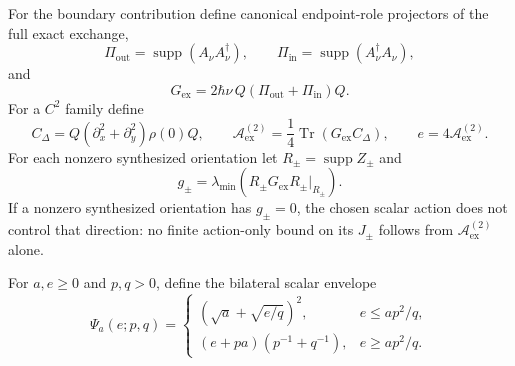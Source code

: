 \documentclass[aps,pra,preprint,nofootinbib]{revtex4-2}
\newcommand{\Tr}{\operatorname{Tr}}
\newcommand{\supp}{\operatorname{supp}}
\newcommand{\Aact}{\mathcal A}
\begin{document}
For the boundary contribution define canonical endpoint-role projectors of the full exact exchange,
\begin{equation}
\Pi_{\mathrm{out}}=\supp(A_\nu A_\nu^\dagger),
\qquad
\Pi_{\mathrm{in}}=\supp(A_\nu^\dagger A_\nu),
\label{eq:inout}
\end{equation}
and
\begin{equation}
G_{\mathrm{ex}}=2\hbar\nu\,Q(\Pi_{\mathrm{out}}+\Pi_{\mathrm{in}})Q.
\label{eq:Gex}
\end{equation}
For a $C^2$ family define
\begin{equation}
C_\Delta=Q(\partial_x^2+\partial_y^2)\rho(0)Q,
\qquad
\Aact_{\mathrm{ex}}^{(2)}=\frac14\Tr(G_{\mathrm{ex}}C_\Delta),
\qquad
e=4\Aact_{\mathrm{ex}}^{(2)}.
\label{eq:Aex}
\end{equation}
For each nonzero synthesized orientation let $R_\pm=\supp Z_\pm$ and
\begin{equation}
g_\pm=\lambda_{\min}\!\left(R_\pm G_{\mathrm{ex}}R_\pm\big|_{R_\pm}\right).
\label{eq:gpm}
\end{equation}
If a nonzero synthesized orientation has $g_\pm=0$, the chosen scalar action does not control that direction: no finite action-only bound on its $J_\pm$ follows from $\Aact_{\mathrm{ex}}^{(2)}$ alone.

For $a,e\ge0$ and $p,q>0$, define the bilateral scalar envelope
\begin{equation}
\Psi_a(e;p,q)=
\begin{cases}
(\sqrt a+\sqrt{e/q})^2,&e\le ap^2/q,\\[1mm]
(e+pa)(p^{-1}+q^{-1}),&e\ge ap^2/q.
\end{cases}
\label{eq:Psi}
\end{equation}
\end{document}
